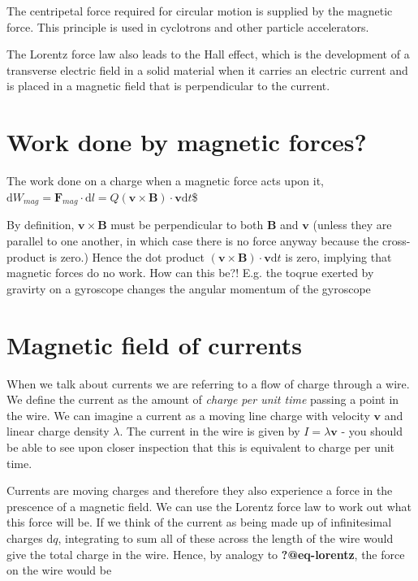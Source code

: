 \documentclass[
  letterpaper,
  DIV=11,
  numbers=noendperiod]{scrreprt}
\begin{document}
The centripetal force required for circular motion is supplied by the
magnetic force. This principle is used in cyclotrons and other particle
accelerators.

The Lorentz force law also leads to the Hall effect, which is the
development of a transverse electric field in a solid material when it
carries an electric current and is placed in a magnetic field that is
perpendicular to the current.

\section{Work done by magnetic
forces?}\label{work-done-by-magnetic-forces}

The work done on a charge when a magnetic force acts upon it,
\(\mathrm{d}W_{mag} = \mathrm{\mathbf{F}}_{mag} \cdot \mathrm{d}l = Q(\mathrm{\mathbf{v}}\times \mathrm{\mathbf{B}})\cdot \mathrm{\mathbf{v}}\mathrm{d}t\)\$

By definition, \(\mathrm{\mathbf{v}}\times \mathrm{\mathbf{B}}\) must be
perpendicular to both \(\mathrm{\mathbf{B}}\) and
\(\mathrm{\mathbf{v}}\) (unless they are parallel to one another, in
which case there is no force anyway because the cross-product is zero.)
Hence the dot product
\((\mathrm{\mathbf{v}}\times \mathrm{\mathbf{B}})\cdot \mathrm{\mathbf{v}}\mathrm{d}t\)
is zero, implying that magnetic forces do no work. How can this be?!
E.g. the toqrue exerted by gravirty on a gyroscope changes the angular
momentum of the gyroscope

\section{Magnetic field of currents}\label{sec-magcurrents1}

When we talk about currents we are referring to a flow of charge through
a wire. We define the current as the amount of \emph{charge per unit
time} passing a point in the wire. We can imagine a current as a moving
line charge with velocity \(\mathrm{\mathbf{v}}\) and linear charge
density \(\lambda\). The current in the wire is given by
\(I = \lambda \mathrm{\mathbf{v}}\) - you should be able to see upon
closer inspection that this is equivalent to charge per unit time.

Currents are moving charges and therefore they also experience a force
in the prescence of a magnetic field. We can use the Lorentz force law
to work out what this force will be. If we think of the current as being
made up of infinitesimal charges \(\mathrm{d} q\), integrating to sum
all of these across the length of the wire would give the total charge
in the wire. Hence, by analogy to \textbf{?@eq-lorentz}, the force on
the wire would be
\end{document}

